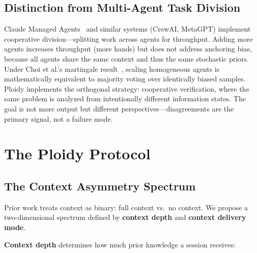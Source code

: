 \documentclass[11pt]{article}
\begin{document}
\subsection{Distinction from Multi-Agent Task Division}
\label{sec:distinction}

Claude Managed Agents~\citep{anthropic2026managedagents} and similar systems (CrewAI, MetaGPT) implement cooperative division---splitting work across agents for throughput. Adding more agents increases throughput (more hands) but does not address anchoring bias, because all agents share the same context and thus the same stochastic priors. Under Choi et al.'s martingale result~\citep{choi2025debate}, scaling homogeneous agents is mathematically equivalent to majority voting over identically biased samples. Ploidy implements the orthogonal strategy: cooperative verification, where the same problem is analyzed from intentionally different information states. The goal is not more output but different perspectives---disagreements are the primary signal, not a failure mode.

\section{The Ploidy Protocol}
\label{sec:protocol}

\subsection{The Context Asymmetry Spectrum}
\label{sec:spectrum}

Prior work treats context as binary: full context vs.\ no context. We propose a two-dimensional spectrum defined by \textbf{context depth} and \textbf{context delivery mode}.

\textbf{Context depth} determines how much prior knowledge a session receives:
\end{document}
